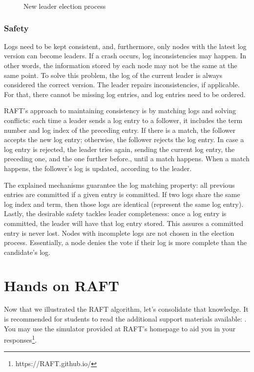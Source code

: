 \documentclass[12pt,a4paper]{article}
\begin{document}
\begin{figure}[h!]
    \centering
    \qquad
    \caption{New leader election process}%
    \label{fig:leader_election}%
\end{figure}


\subsubsection{Safety}
Logs need to be kept consistent, and, furthermore, only nodes with the latest log version can become leaders. 
If a crash occurs, log inconsistencies may happen. In other words, the information stored by each node may not be the same at the same point. To solve this problem, the log of the current leader is always considered the correct version. The leader repairs inconsistencies, if applicable. For that, there cannot be missing log entries, and log entries need to be ordered.

RAFT's approach to maintaining consistency is by matching logs and solving conflicts: each time a leader sends a log entry to a follower, it includes the term number and log index of the preceding entry. If there is a match, the follower accepts the new log entry; otherwise, the follower rejects the log entry. In case a log entry is rejected, the leader tries again, sending the current log entry, the preceding one, and the one further before., until a match happens. When a match happens, the follower's log is updated, according to the leader.


The explained mechanisms guarantee the log matching property: all previous entries are committed if a given entry is committed. If two logs share the same log index and term, then those logs are identical (represent the same log entry). Lastly, the desirable safety tackles leader completeness: once a log entry is committed, the leader will have that log entry stored. This assures a committed entry is never lost. Nodes with incomplete logs are not chosen in the election process. Essentially, a node denies the vote if their log is more complete than the candidate's log.


\section{Hands on RAFT}
Now that we illustrated the RAFT algorithm, let's consolidate that knowledge. It is recommended for students to read the additional support materials available: \cite{raft_paper,raft_homepage}. You may use the simulator provided at RAFT's homepage to aid you in your responses\footnote{https://RAFT.github.io/}.
\end{document}
